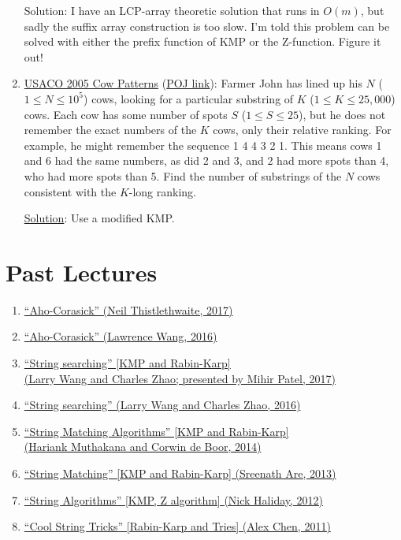 \documentclass[11pt, oneside]{article}
\begin{document}
\begin{enumerate}
  Solution: I have an LCP-array theoretic solution that runs in \( O(m) \), but sadly the suffix array construction is too slow. I'm told this problem can be solved with either the prefix function of KMP or the Z-function. Figure it out!

  \item \href{https://contest.usaco.org/DEC05.htm}{USACO 2005 Cow Patterns} (\href{http://poj.org/problem?id=3167}{POJ link}): Farmer John has lined up his \( N \) (\( 1 \leq N \leq 10^5 \)) cows,
  looking for a particular substring of \( K \) (\( 1 \leq K \leq 25,000 \)) cows.
  Each cow has some number of spots \( S \) (\( 1 \leq S \leq 25 \)), but he does
  not remember the exact numbers of the \( K \) cows, only their relative ranking. For example, he might
  remember the sequence 1 4 4 3 2 1. This means cows 1 and 6 had the same numbers, as did 2 and 3,
  and 2 had more spots than 4, who had more spots than 5.
  Find the number of substrings of the \( N \) cows consistent with the \( K \)-long ranking.

  \href{https://contest.usaco.org/DEC05anal/cpattern.htm}{Solution}: Use a modified KMP.

\end{enumerate}

\newpage

\section{Past Lectures}

\begin{enumerate}
  \item \href{https://activities.tjhsst.edu/sct/lectures/1617/2017-06-02_Aho_Corasick.pdf}{``Aho-Corasick'' (Neil Thistlethwaite, 2017)}
  \item \href{https://activities.tjhsst.edu/sct/lectures/1516/SCT_Aho_Corasick.pdf}{``Aho-Corasick'' (Lawrence Wang, 2016)}
  \item \href{https://activities.tjhsst.edu/sct/lectures/1718/2017-10-27_String_Searching.pdf}{``String searching'' [KMP and Rabin-Karp] \\ (Larry Wang and Charles Zhao; presented by Mihir Patel, 2017)}
  \item \href{https://activities.tjhsst.edu/sct/lectures/1617/2016-11-11_String_Searching.pdf}{``String searching'' (Larry Wang and Charles Zhao, 2016)}
  \item \href{https://activities.tjhsst.edu/sct/lectures/1415/stringmatching_10_3_14.pdf}{``String Matching Algorithms'' [KMP and Rabin-Karp] \\ (Hariank Muthakana and Corwin de Boor, 2014)}
  \item \href{https://activities.tjhsst.edu/sct/lectures/1314/string_matching_11_01_13.pdf}{``String Matching'' [KMP and Rabin-Karp] (Sreenath Are, 2013)}
  \item \href{https://activities.tjhsst.edu/sct/lectures/1112/string.pdf}{``String Algorithms'' [KMP, Z algorithm] (Nick Haliday, 2012)}
  \item \href{https://activities.tjhsst.edu/sct/lectures/1112/strings111811.pdf}{``Cool String Tricks'' [Rabin-Karp and Tries] (Alex Chen, 2011)}
\end{enumerate}
\end{document}
